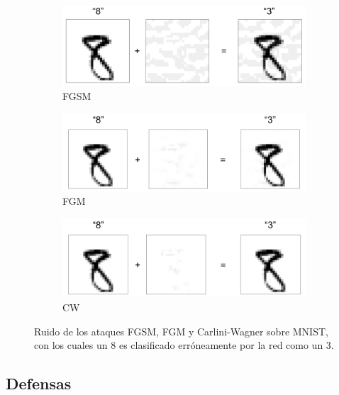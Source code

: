 \begin{figure}[h!]
    \centering
    \begin{subfigure}[b]{0.55\textwidth}
        \centering
        \includegraphics[width=\textwidth]{images/fgms_example.png}
        \caption{FGSM}
        \label{fgsm_example}
    \end{subfigure}
    \begin{subfigure}[b]{0.55\textwidth}
        \centering
        \includegraphics[width=\textwidth]{images/fgm_example.png}
        \caption{FGM}
        \label{fgm_example}
    \end{subfigure}
    \begin{subfigure}[b]{0.55\textwidth}
        \centering
        \includegraphics[width=\textwidth]{images/CW_example.png}
        \caption{CW}
        \label{CW_example}
    \end{subfigure}
    \caption{Ruido de los ataques FGSM, FGM y Carlini-Wagner sobre MNIST, con los cuales un 8 es clasificado erróneamente por la red como un 3.}
    \label{attack_examples}
\end{figure}

\subsection{Defensas}


